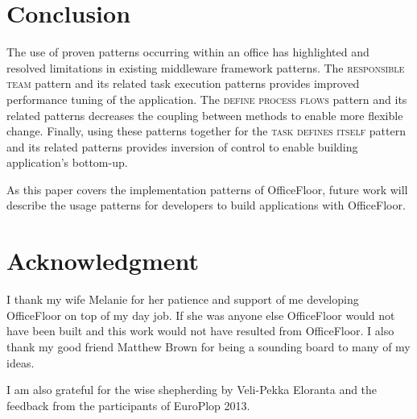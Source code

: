 \documentclass[prodmode]{style/acmlarge}
\begin{document}
\section{Conclusion}

The use of proven patterns occurring within an office has highlighted and
resolved limitations in existing middleware framework patterns.  The
\textsc{responsible team} pattern and its related task execution patterns
provides improved performance tuning of the application.  The \textsc{define
process flows} pattern and its related patterns decreases the coupling between
methods to enable more flexible change.  Finally, using these patterns together
for the \textsc{task defines itself} pattern and its related patterns provides
inversion of control to enable building application's bottom-up.

As this paper covers the implementation patterns of OfficeFloor, future work
will describe the usage patterns for developers to build applications with
OfficeFloor.



\section*{Acknowledgment} 

I thank my wife Melanie for her patience and support
of me developing OfficeFloor on top of my day job.  If she was anyone else
OfficeFloor would not have been built and this work would not have resulted from
OfficeFloor.  I also thank my good friend Matthew Brown for being a sounding
board to many of my ideas.

I am also grateful for the wise shepherding by Veli-Pekka Eloranta and the
feedback from the participants of EuroPlop 2013.




\end{document}
